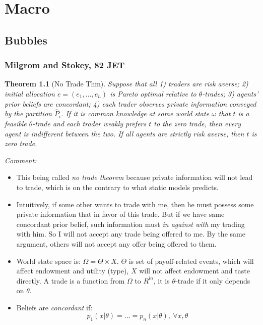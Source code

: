 \documentclass{book}
\theoremstyle{plain}
\newtheorem{thm}{Theorem}[section] %
\theoremstyle{definition}
\begin{document}
\part{Macro} %
\label{cha:chapter_name}

\chapter{Bubbles} %
\label{ch:bubbles}

\section{Milgrom and Stokey, 82 JET} %
\label{sec:milgrom_and_stokey_82_jet}

\textbf{}

\begin{thm}[No Trade Thm]
Suppose that all 1) traders are risk averse; 2) initial allocation $e=(e_1,...,e_n)$ is Pareto optimal relative to $\theta$-trades; 3) agents' prior beliefs are concordant; 4) each trader observes private information conveyed by the partition $\hat P_i$. If it is common knowledge at some world state $\omega$ that $t$ is a feasible $\theta$-trade and each trader weakly prefers $t$ to the zero trade, then every agent is indifferent between the two. If all agents are strictly risk averse, then $t$ is zero trade.
\end{thm}

\noindent
\textit{Comment:}
\begin{itemize}
	\item This being called \textit{no trade theorem} because private information will not lead to trade, which is on the contrary to what static models predicts.

	\item Intuitively, if some other wants to trade with me, then he must possess some private information that in favor of this trade. But if we have same concordant prior belief, such information must \textit{in against with} my trading with him. So I will not accept any trade being offered to me. By the same argument, others will not accept any offer being offered to them.

	\item World state space is: $\Omega=\Theta \times X$. $\Theta$ is set of payoff-related events, which will affect endowment and utility (type), $X$ will not affect endowment and taste directly.
	A trade is a function from $\Omega$ to $R^{ln}$, it is $\theta$-trade if it only depends on $\theta$.

	\item Beliefs are \textit{concordant} if:
	\[p_1(x|\theta)=...=p_n(x|\theta),\ \forall x,\theta\]
\end{itemize}
\end{document}
